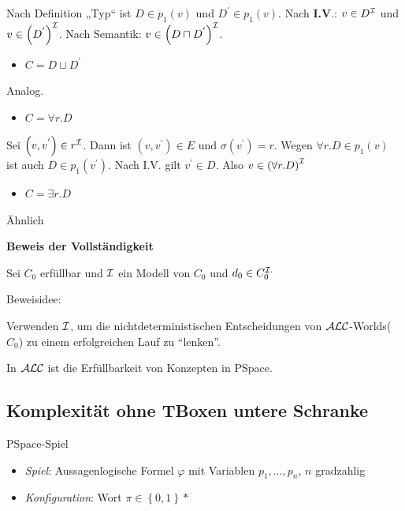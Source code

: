 Nach Definition „Typ`` ist $D \in p_{1}\left( v \right)$ und
$D^{'} \in p_{1}\left( v \right)$. Nach \textbf{I.V}.: $v \in D^{\mathcal{I}}$
und $v \in \left( D^{'} \right)^{\mathcal{I}}$. Nach Semantik:
$v \in \left( D \sqcap D^{'} \right)^{\mathcal{I}}$.

\begin{itemize}
\item
  $C = D \sqcup D^{'}$
\end{itemize}

Analog.

\begin{itemize}
\item
  $C = \forall r.D$
\end{itemize}

Sei $\left( v,v^{'} \right) \in r^{\mathcal{I}}$. Dann ist
$\left( v,v^{'} \right) \in E$ und $\sigma\left( v^{'} \right) = r$.
Wegen $\forall r.D \in p_{1}(v)$ ist auch
$D \in p_{1}\left( v^{'} \right)$. Nach I.V. gilt $v^{'} \in D$.
Also $v \in \left( \forall r.D \right)^{\mathcal{I}}$

\begin{itemize}
\item
  $C = \exists r.D$
\end{itemize}

Ähnlich

\textbf{Beweis der Vollständigkeit}

Sei $C_0$ erfüllbar und $\mathcal{I}$ ein Modell von $C_0$ und $d_0 \in C_0^{\mathcal{I}.}$

Beweisidee:

Verwenden $\mathcal{I}$, um die nichtdeterministischen Entscheidungen von $\mathcal{A}\mathcal{L}\mathcal{C}$-Worlds($C_0$) zu einem erfolgreichen Lauf zu ``lenken''.

\begin{theorem}
In $\mathcal{A}\mathcal{L}\mathcal{C}$ ist die Erfüllbarkeit von Konzepten in PSpace.
\end{theorem}

\subsection{Komplexität ohne TBoxen untere
Schranke}\label{komplexituxe4t-ohne-tboxen-untere-schranke}

\begin{definition}{PSpace-Spiel}

\begin{itemize}
\item
  \emph{Spiel}: Aussagenlogische Formel $\varphi$ mit Variablen
  $p_{1},\ldots,p_{n}$, $n$ gradzahlig
\item
  \emph{Konfiguration}: Wort $\pi \in \left\{ 0,1 \right\}*$
\end{itemize}
\end{definition}

